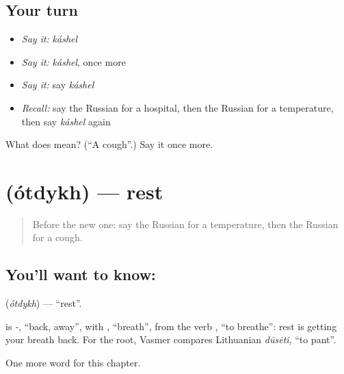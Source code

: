 \subsection*{Your turn}
\begin{itemize}
\raggedright
  \item \emph{Say it:} \emph{káshel}
  \item \emph{Say it:} \emph{káshel}, once more
  \item \emph{Say it:} say \emph{káshel}
  \item \emph{Recall:} say the Russian for a hospital, then the Russian for a temperature, then say \emph{káshel} again
\end{itemize}

\begin{tcolorbox}[breakable,colback=teal!4,colframe=teal!35!black,title={Before you move on}]
What does  mean? (\textquotedblleft{}A cough\textquotedblright{}.) Say it once more.
\end{tcolorbox}
\section[\texorpdfstring{\ru{отдых} (ótdykh)}{отдых (ótdykh)}]{ (ótdykh) — rest}

\label{lesson:RU-C33-rest}



\begin{quote}
Before the new one: say the Russian for a temperature, then the Russian for a cough.
\end{quote}

\subsection*{You'll want to know: }
\textbf{} (\emph{ótdykh}) — \textquotedblleft{}rest\textquotedblright{}.

\begin{cousinweb}
\textbf{} is \emph{-}, \textquotedblleft{}back, away\textquotedblright{}, with \emph{}, \textquotedblleft{}breath\textquotedblright{}, from the verb \emph{}, \textquotedblleft{}to breathe\textquotedblright{}: rest is getting your breath back. For the root, Vasmer compares Lithuanian \emph{dūsėti}, \textquotedblleft{}to pant\textquotedblright{}.
\end{cousinweb}

\begin{grammarlens}[title={What you've built}]
One more word for this chapter.
\end{grammarlens}

